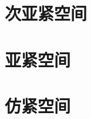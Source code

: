 \documentclass[main.tex]{subfiles}
\begin{document}
\section{次亚紧空间}\label{ch2.1}

\section{亚紧空间}\label{ch2.2}

\section{仿紧空间}\label{ch2.3}
	
\end{document}
